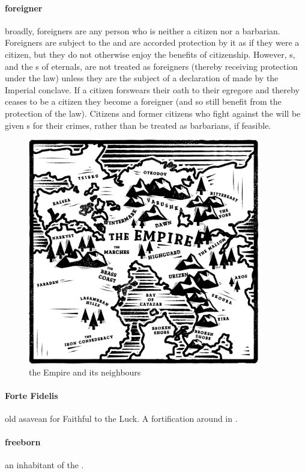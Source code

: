 \paragraph{foreigner} broadly, foreigners are any person who is neither a citizen nor a barbarian. Foreigners are subject to the  and are accorded protection by it as if they were a citizen, but they do not otherwise enjoy the benefits of citizenship. However, s, and the s of eternals, are not treated as foreigners (thereby receiving protection under the law) unless they are the subject of a declaration of  made by the Imperial conclave. If a citizen forswears their oath to their egregore and thereby ceases to be a citizen they become a foreigner (and so still benefit from the protection of the law). Citizens and former citizens who fight against the  will be given s for their crimes, rather than be treated as barbarians, if feasible. \begin{figure}\centering\includegraphics[width=0.9\textwidth]{encyclopedia/worldmap}\caption{the Empire and its neighbours}\end{figure}
\paragraph{Forte Fidelis} old asavean for Faithful to the Luck. A fortification around  in .
\paragraph{freeborn} an inhabitant of the .
